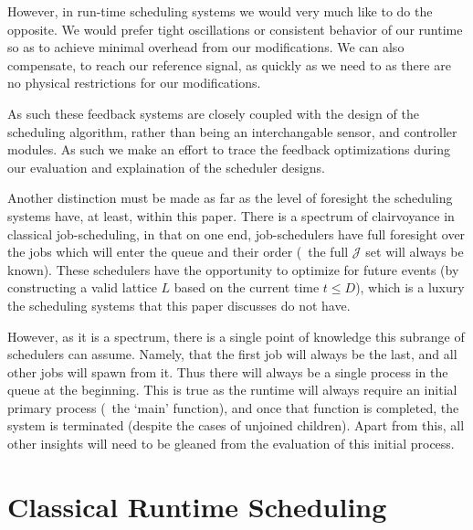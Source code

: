 However, in run-time scheduling systems we would very much like to do the 
opposite. We would prefer tight oscillations or consistent behavior of our 
runtime so as to achieve minimal overhead from our modifications. We can also 
compensate, to reach our reference signal, as quickly as we need to as there 
are no physical restrictions for our modifications.

As such these feedback systems are closely coupled with the design of the 
scheduling algorithm, rather than being an interchangable sensor, and controller
modules. As such we make an effort to trace the feedback optimizations during
our evaluation and explaination of the scheduler designs.

Another distinction must be made as far as the level of foresight the scheduling 
systems have, at least, within this paper. There is a spectrum of clairvoyance 
in classical job-scheduling, in that on one end, job-schedulers have full 
foresight over the jobs which will enter the queue and their order 
(\ie~the full $\mathscr{J}$ set will always be known). These schedulers have the 
opportunity to optimize for future events (by constructing a valid lattice $L$ 
based on the current time $t \leq D$), which is a luxury the scheduling systems 
that this paper discusses do not have.

However, as it is a spectrum, there is a single point of knowledge this subrange 
of schedulers can assume. Namely, that the first job will always be the last, 
and all other jobs will spawn from it. Thus there will always be a single 
process in the queue at the beginning. This is true as the runtime will always 
require an initial primary process (\eg~the `main' function), and once that 
function is completed, the system is terminated 
(despite the cases of unjoined
children). Apart from this, all other insights will need to be gleaned from the 
evaluation of this initial process.

\section{Classical Runtime Scheduling}


